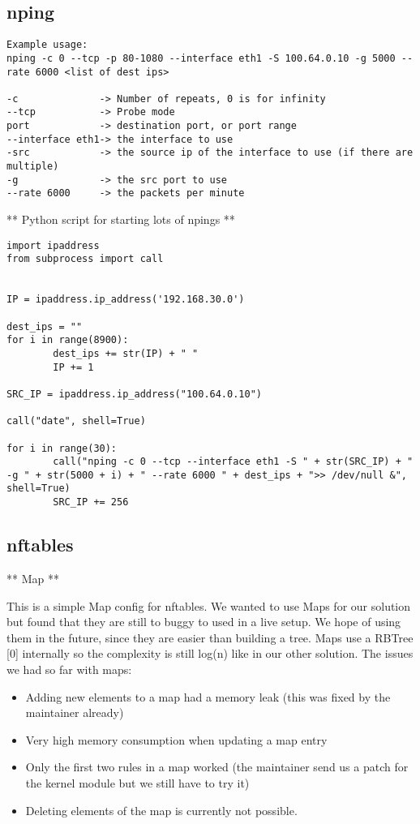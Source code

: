 \subsection{nping}\label{nping}

\begin{verbatim}
Example usage:
nping -c 0 --tcp -p 80-1080 --interface eth1 -S 100.64.0.10 -g 5000 --rate 6000 <list of dest ips>

-c              -> Number of repeats, 0 is for infinity
--tcp           -> Probe mode
port            -> destination port, or port range
--interface eth1-> the interface to use
-src            -> the source ip of the interface to use (if there are multiple)
-g              -> the src port to use
--rate 6000     -> the packets per minute
\end{verbatim}

** Python script for starting lots of npings **

\begin{verbatim}
import ipaddress
from subprocess import call


IP = ipaddress.ip_address('192.168.30.0')

dest_ips = ""
for i in range(8900):
        dest_ips += str(IP) + " "
        IP += 1

SRC_IP = ipaddress.ip_address("100.64.0.10")

call("date", shell=True)

for i in range(30):
        call("nping -c 0 --tcp --interface eth1 -S " + str(SRC_IP) + " -g " + str(5000 + i) + " --rate 6000 " + dest_ips + ">> /dev/null &", shell=True)
        SRC_IP += 256
\end{verbatim}

\subsection{nftables}\label{nftables-1}

** Map **

This is a simple Map config for nftables. We wanted to use Maps for our
solution but found that they are still to buggy to used in a live setup.
We hope of using them in the future, since they are easier than building
a tree. Maps use a RBTree {[}0{]} internally so the complexity is still
log(n) like in our other solution. The issues we had so far with maps:

\begin{itemize}
\itemsep1pt\parskip0pt
\item
  Adding new elements to a map had a memory leak (this was fixed by the
  maintainer already)
\item
  Very high memory consumption when updating a map entry
\item
  Only the first two rules in a map worked (the maintainer send us a
  patch for the kernel module but we still have to try it)
\item
  Deleting elements of the map is currently not possible.
\end{itemize}

